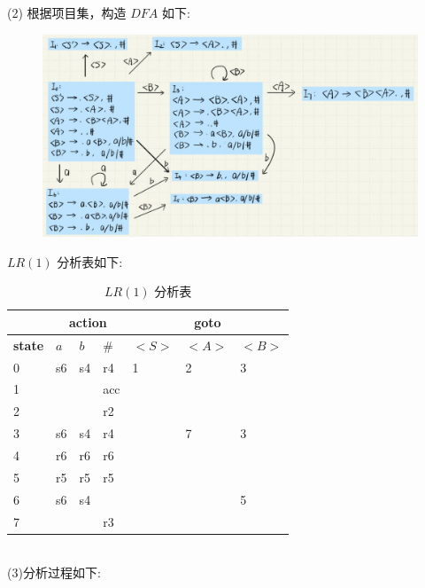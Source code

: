 \documentclass{article}
\begin{document}
(2)
根据项目集，构造 $DFA$ 如下:
\begin{figure}[htbp]
    \centering
    \includegraphics[scale=0.8]{DFA.png}
    \caption{}
\end{figure}
\newpage
$LR(1)$ 分析表如下:
\begin{table}[h!]
    \begin{center}
        \caption{$LR(1)$ 分析表}
        \setlength{\tabcolsep}{8mm} {
        \begin{tabular}{|l|l|l|l|l|l|l|} 
        \hline
        & \multicolumn{3}{c|}{\textbf{action}} & \multicolumn{3}{c|}{\textbf{goto}} \\
        \hline
        \textbf{state} & \textbf{$a$} & \textbf{$b$} &\textbf{$\#$} & \textbf{$<S>$} & \textbf{$<A>$} & \textbf{$<B>$}\\
        \hline
        0 & s6 & s4 & r4 & 1 & 2 & 3 \\
        \hline
        1 & & & acc & & & \\
        \hline
        2 & & & r2 & & & \\
        \hline
        3 & s6 & s4 & r4 & & 7 & 3 \\
        \hline
        4 & r6 & r6 & r6 & & & \\
        \hline
        5 & r5 & r5 & r5 & & & \\
        \hline
        6 & s6 & s4 & & & & 5\\
        \hline
        7 & & & r3 & & & \\
        \hline
      \end{tabular} 
      }
    \end{center}
\end{table}
\\
(3)分析过程如下:
\newpage
\end{document}
